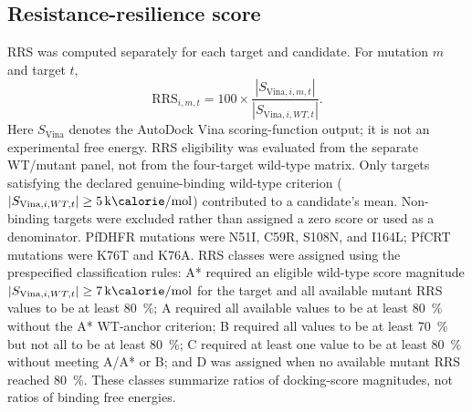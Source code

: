\documentclass[journal=jcisd8,manuscript=article]{achemso}
\begin{document}
\subsection{Resistance-resilience score}\label{sec:methods_rrs}
RRS was computed separately for each target and candidate. For mutation $m$ and target $t$,
\begin{equation}
\mathrm{RRS}_{i,m,t}=100\times\frac{|S_{\mathrm{Vina},i,m,t}|}{|S_{\mathrm{Vina},i,WT,t}|}.
\label{eq:rrs}
\end{equation}
Here $S_{\mathrm{Vina}}$ denotes the AutoDock Vina scoring-function output; it is not an experimental free energy. RRS eligibility was evaluated from the separate WT/mutant panel, not from the four-target wild-type matrix. Only targets satisfying the declared genuine-binding wild-type criterion ($|S_{\mathrm{Vina},i,WT,t}|\geq\qty{5}{\kilo\calorie\per\mole}$) contributed to a candidate's mean. Non-binding targets were excluded rather than assigned a zero score or used as a denominator. PfDHFR mutations were N51I, C59R, S108N, and I164L; PfCRT mutations were K76T and K76A. RRS classes were assigned using the prespecified classification rules: A* required an eligible wild-type score magnitude $|S_{\mathrm{Vina},i,WT,t}|\geq\qty{7}{\kilo\calorie\per\mole}$ for the target and all available mutant RRS values to be at least \qty{80}{\percent}; A required all available values to be at least \qty{80}{\percent} without the A* WT-anchor criterion; B required all values to be at least \qty{70}{\percent} but not all to be at least \qty{80}{\percent}; C required at least one value to be at least \qty{80}{\percent} without meeting A/A* or B; and D was assigned when no available mutant RRS reached \qty{80}{\percent}. These classes summarize ratios of docking-score magnitudes, not ratios of binding free energies.
\end{document}
